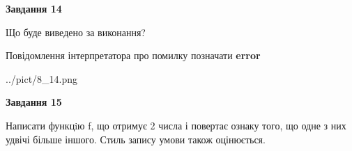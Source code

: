 \documentclass[11pt, ukrainian]{article}
\begin{document}
{\begin {large}
{\begin {center}\textbf{Завдання 14}\end {center}}\par
Що буде виведено за виконання? \par
Повідомлення інтерпретатора про помилку позначати \textbf{error}

\begin{center}
	{../pict/8_14.png}
\end{center}
\newpage

{\begin {center}\textbf{Завдання 15}\end {center}}\par

Написати функцiю f, що отримує 2 числа і повертає ознаку того, що одне з них удвічі більше іншого. Стиль запису умови також оцінюється.\par
\newpage

\end {large}}
\end{document}
